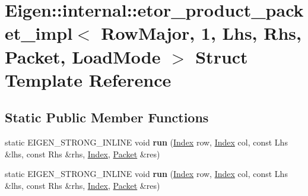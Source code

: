 \hypertarget{struct_eigen_1_1internal_1_1etor__product__packet__impl_3_01_row_major_00_011_00_01_lhs_00_01_rh0bb33c71f799f63503799bf23fcbe7a3}{}\section{Eigen\+:\+:internal\+:\+:etor\+\_\+product\+\_\+packet\+\_\+impl$<$ Row\+Major, 1, Lhs, Rhs, Packet, Load\+Mode $>$ Struct Template Reference}
\label{struct_eigen_1_1internal_1_1etor__product__packet__impl_3_01_row_major_00_011_00_01_lhs_00_01_rh0bb33c71f799f63503799bf23fcbe7a3}
\subsection*{Static Public Member Functions}
\begin{DoxyCompactItemize}
\item 
\mbox{\label{struct_eigen_1_1internal_1_1etor__product__packet__impl_3_01_row_major_00_011_00_01_lhs_00_01_rh0bb33c71f799f63503799bf23fcbe7a3_a148710d5f0ef326651e790c828faa779}} 
static E\+I\+G\+E\+N\+\_\+\+S\+T\+R\+O\+N\+G\+\_\+\+I\+N\+L\+I\+NE void {\bfseries run} (\hyperlink{namespace_eigen_a62e77e0933482dafde8fe197d9a2cfde}{Index} row, \hyperlink{namespace_eigen_a62e77e0933482dafde8fe197d9a2cfde}{Index} col, const Lhs \&lhs, const Rhs \&rhs, \hyperlink{namespace_eigen_a62e77e0933482dafde8fe197d9a2cfde}{Index}, \hyperlink{union_eigen_1_1internal_1_1_packet}{Packet} \&res)
\item 
\mbox{\label{struct_eigen_1_1internal_1_1etor__product__packet__impl_3_01_row_major_00_011_00_01_lhs_00_01_rh0bb33c71f799f63503799bf23fcbe7a3_a148710d5f0ef326651e790c828faa779}} 
static E\+I\+G\+E\+N\+\_\+\+S\+T\+R\+O\+N\+G\+\_\+\+I\+N\+L\+I\+NE void {\bfseries run} (\hyperlink{namespace_eigen_a62e77e0933482dafde8fe197d9a2cfde}{Index} row, \hyperlink{namespace_eigen_a62e77e0933482dafde8fe197d9a2cfde}{Index} col, const Lhs \&lhs, const Rhs \&rhs, \hyperlink{namespace_eigen_a62e77e0933482dafde8fe197d9a2cfde}{Index}, \hyperlink{union_eigen_1_1internal_1_1_packet}{Packet} \&res)
\end{DoxyCompactItemize}


